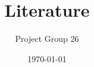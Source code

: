 \documentclass[11pt]{article}
\title{Literature}
\author{Project Group 26}
\date{\today}
\begin{document}
\nocite{*}
\printbibliography
\end{document}
